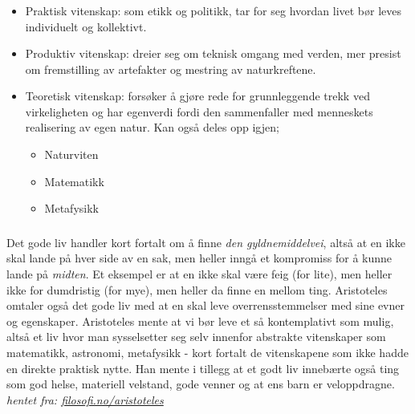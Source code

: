 \documentclass[a4paper]{IEEEtran}
\begin{document}
        \subsubsection{}
        \begin{itemize} 
            \item Praktisk vitenskap: som etikk og politikk, tar for seg 
            hvordan livet bør leves individuelt og kollektivt.
            \item Produktiv vitenskap: dreier seg om teknisk omgang med verden, mer 
            presist om fremstilling av artefakter og mestring av naturkreftene.
            \item Teoretisk vitenskap: forsøker å gjøre rede for grunnleggende 
            trekk ved virkeligheten og har egenverdi fordi den sammenfaller
            med menneskets realisering av egen natur. Kan også deles opp igjen;
            \begin{itemize}
                \item Naturviten
                \item Matematikk 
                \item Metafysikk
            \end{itemize}
        \end{itemize} \cite{rephefte_aristoteles} \medskip 

        \subsubsection{}
        Det gode liv handler kort fortalt om å finne \textit{den gyldnemiddelvei}, 
        altså at en ikke skal lande på hver side av en sak, men heller inngå et 
        kompromiss for å kunne lande på \textit{midten}. Et eksempel er 
        at en ikke skal være feig (for lite), men heller ikke for dumdristig (for mye),
        men heller da finne en mellom ting. Aristoteles omtaler også det gode liv med 
        at en skal leve overrensstemmelser med sine evner og egenskaper.
        Aristoteles mente at vi bør leve et så kontemplativt som mulig, altså et 
        liv hvor man sysselsetter seg selv innenfor abstrakte vitenskaper som 
        matematikk, astronomi, metafysikk - kort fortalt de vitenskapene som 
        ikke hadde en direkte praktisk nytte. Han mente i tillegg at et godt liv
        innebærte også ting som god helse, materiell velstand, gode venner 
        og at ens barn er veloppdragne. 
        \textit{hentet fra: \url{filosofi.no/aristoteles}} \medskip
\end{document}
